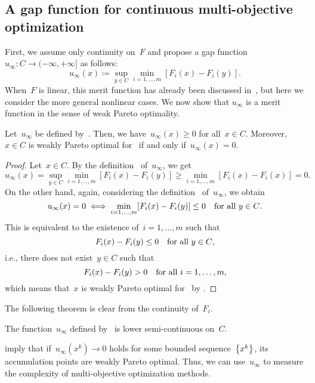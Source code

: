 \documentclass[../../main]{subfiles}
\begin{document}
\subsection{A gap function for continuous multi-objective optimization} 
First, we assume only continuity on~$F$ and propose a gap function~$u_\infty \colon C \to (-\infty, +\infty]$ as follows:
\begin{equation} \label{eq:gap_MO}
    u_\infty(x) \coloneqq \sup_{y \in C} \min_{i = 1, \dots, m} [ F_i(x) - F_i(y) ] 
.\end{equation}
When~$F$ is linear, this merit function has already been discussed in~\cite{Liu2009}, but here we consider the more general nonlinear cases.
We now show that $u_\infty$ is a merit function in the sense of weak Pareto optimality.
\begin{theorem} 
    Let~$u_\infty$ be defined by~.
    Then, we have~$u_\infty(x) \ge 0$ for all~$x \in C$.
    Moreover,~$x \in C$ is weakly Pareto optimal for~ if and only if~$u_\infty(x) = 0$.
\end{theorem}
\begin{proof}
    Let~$x \in C$.
    By the definition~ of~$u_\infty$, we get
    \begin{equation}
        u_\infty(x) = \sup_{y \in C} \min_{i = 1, \dots, m} [ F_i(x) - F_i(y) ]
                 \ge \min_{i = 1, \dots, m} [ F_i(x) - F_i(x) ] = 0
    .\end{equation} 
    On the other hand, again, considering the definition~ of~$u_\infty$, we obtain
    \begin{equation}
        u_\infty(x) = 0 \iff \min_{i = 1, \dots, m} [ F_i(x) - F_i(y) ] \le 0 \forallcondition{y \in C}
    .\end{equation} 
    This is equivalent to the existence of~$i = 1, \dots, m$ such that
    \begin{equation}
        F_i(x) - F_i(y) \le 0 \forallcondition{y \in C}
    ,\end{equation} 
    i.e., there does not exist~$y \in C$ such that
    \begin{equation}
        F_i(x) - F_i(y) > 0 \forallcondition{i = 1, \dots, m}
    ,\end{equation} 
    which means that~$x$ is weakly Pareto optimal for~ by .
\end{proof}

The following theorem is clear from the continuity of~$F_i$.
\begin{theorem} 
    The function~$u_\infty$ defined by~ is lower semi-continuous on~$C$.
\end{theorem}
 imply that if~$u_\infty\left(x^k\right) \to 0$ holds for some bounded sequence~$\set*{x^k}$, its accumulation points are weakly Pareto optimal.
Thus, we can use~$u_\infty$ to measure the complexity of multi-objective optimization methods.
\end{document}
